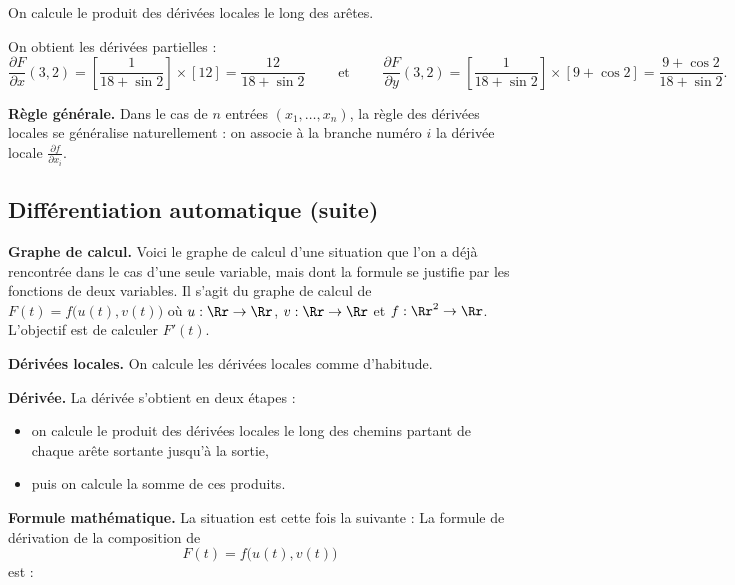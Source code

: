\documentclass[11pt,class=report,crop=false]{standalone}
\begin{document}

On calcule le produit des dérivées locales le long des arêtes. 

On obtient les dérivées partielles :
$$\frac{\partial F}{\partial x} (3,2) = \left[ \frac{1}{18+\sin 2} \right] \times [12] = \frac{12}{18 + \sin 2}
\qquad \text{ et } \qquad 
\frac{\partial F}{\partial y} (3,2) = \left[ \frac{1}{18+\sin 2} \right] \times [9 + \cos 2] = \frac{9 + \cos 2}{18+\sin 2}.$$


\bigskip
\textbf{Règle générale.}
Dans le cas de $n$ entrées $(x_1,\ldots,x_n)$, la règle des dérivées locales se généralise naturellement : on associe à la branche numéro $i$ la dérivée locale $\frac{\partial f}{\partial x_i}$.



\subsection{Différentiation automatique (suite)}


\textbf{Graphe de calcul.}
Voici le graphe de calcul d'une situation que l'on a déjà rencontrée dans le cas d'une seule variable, mais dont la formule se justifie par les fonctions de deux variables.
Il s'agit du graphe de calcul de $F(t) = f\big( u(t), v(t) \big)$ où
$u : \Rr \to \Rr$, $v : \Rr \to \Rr$ et $f : \Rr^2 \to \Rr$. L'objectif est de calculer $F'(t)$.


\bigskip
\textbf{Dérivées locales.}
On calcule les dérivées locales comme d'habitude.

\bigskip
\textbf{Dérivée.}
La dérivée s'obtient en deux étapes :
\begin{itemize}
  \item on calcule le produit des dérivées locales le long des chemins partant de chaque arête sortante jusqu'à la sortie,
  \item puis on calcule la somme de ces produits.
\end{itemize}


\bigskip
\textbf{Formule mathématique.}
La situation est cette fois la suivante :
La formule de dérivation de la composition de
$$F(t) = f\big( u(t), v(t) \big)$$
est :
\end{document}
